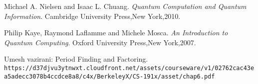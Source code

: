 \documentclass[a4,12pt]{article}
\begin{document}
\begin{thebibliography}{9}
	\bibitem{} 
	Michael A. Nielsen and Isaac L. Chuang. 
	\textit{Quantum Computation and Quantum Information}. 
    Cambridge University Press,New York,2010.
	
	\bibitem{} 
	Philip Kaye, Raymond Laflamme and Michele Mosca. 
	\textit{An Introduction to Quantum Computing}. 
    Oxford University Press,New York,2007.
	
	\bibitem{} 
	Umesh vazirani: Period Finding and Factoring.
	\\\texttt{https://d37djvu3ytnwxt.cloudfront.net/assets/courseware/v1/02762cac43ea5adecc3078b4ccdce8a8/c4x/BerkeleyX/CS-191x/asset/chap6.pdf}
\end{thebibliography}
\end{document}
